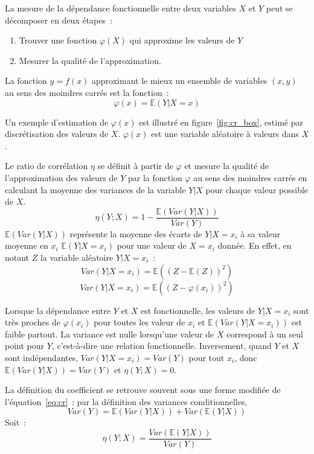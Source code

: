 \documentclass[../main]{subfiles}
\begin{document}
La mesure de la dépendance fonctionnelle entre deux variables $X$ et $Y$ peut se décomposer en deux étapes~:
\begin{enumerate}
    \item Trouver une fonction $\varphi(X)$ qui approxime les valeurs de $Y$
    \item Mesurer la qualité de l'approximation.
\end{enumerate}

La fonction $y = f(x)$ approximant le mieux un ensemble de variables $(x,y)$ au sens des moindres carrés est la fonction~:
\begin{equation}
    \varphi(x) = \mathbb{E}(Y|X = x)
\end{equation}

Un exemple d'estimation de $\varphi(x)$ est illustré en figure~\ref{fig:cr_box}, estimé par discrétisation des valeurs de $X$. $\varphi(x)$ est une variable aléatoire à valeurs dans $X$.

Le ratio de corrélation $\eta$ se définit à partir de $\varphi$ et mesure la qualité de l'approximation des valeurs de $Y$ par la fonction $\varphi$ au sens des moindres carrés en calculant la moyenne des variances de la variable $Y|X$ pour chaque valeur possible de $X$. 
\begin{equation}\label{eq:cr}
   \eta(Y;X) = 1 - \frac{\mathbb{E}(Var(Y|X))}{Var(Y)}
\end{equation}
$\mathbb{E}(Var(Y|X))$ représente la moyenne des écarts de $Y|X=x_i$ à sa valeur moyenne en $x_i$ $\mathbb{E}(Y|X=x_i)$ pour une valeur de $X = x_i$ donnée. 
En effet, en notant $Z$ la variable aléatoire $Y | X=x_i$~: 
$$ Var(Y|X=x_i) = \mathbb{E}((Z - \mathbb{E}(Z))^2)$$
$$ Var(Y|X=x_i) = \mathbb{E}((Z - \varphi(x_i))^2)$$

Lorsque la dépendance entre $Y$ et $X$ est fonctionnelle, les valeurs de $Y|X = x_i$ sont très proches de $\varphi(x_i)$  pour toutes les valeur de $x_i$ et $\mathbb{E}(Var(Y|X=x_i))$ est faible partout. La variance est nulle lorsqu'une valeur de $X$ correspond à un seul point pour $Y$, c'est-à-dire une relation fonctionnelle. 
Inversement, quand $Y$ et $X$ sont indépendantes, $Var(Y|X=x_i) = Var(Y)$ pour tout $x_i$, donc $\mathbb{E}(Var(Y|X)) = Var(Y)$ et $\eta(Y;X) = 0$.

La définition du coefficient se retrouve souvent sous une forme modifiée de l'équation~\ref{eq:cr}~:
par la définition des variances conditionnelles,
$$Var(Y) = \mathbb{E}(Var(Y|X)) + Var(\mathbb{E}(Y|X))$$
Soit~:
\begin{equation}
    \eta(Y;X) = \frac{Var(\mathbb{E}(Y|X))}{Var(Y)}
\end{equation}
\end{document}
